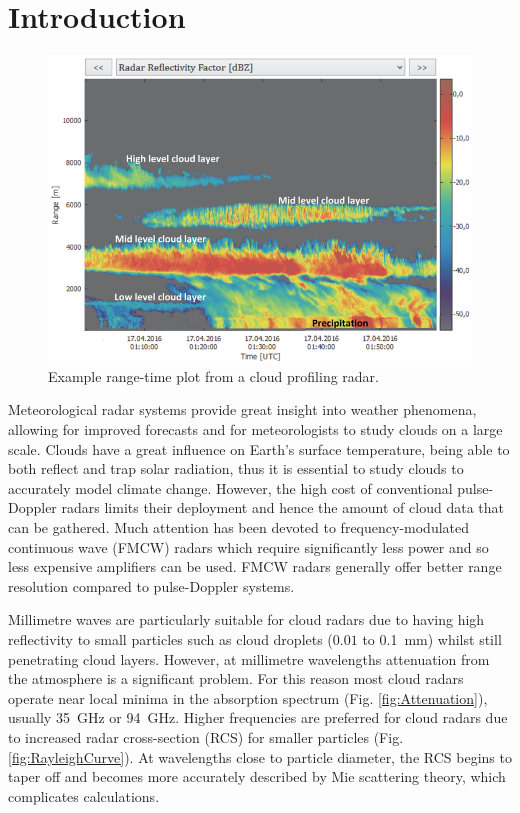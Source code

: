 \documentclass{article}
\begin{document}
\section{Introduction}
\begin{figure}
	\centering
	\includegraphics[width=\textwidth]{example-output}
	\caption{Example range-time plot from a cloud profiling radar.\supercite{RPG}}
	\label{fig:ExampleOutput}
\end{figure}
Meteorological radar systems provide great insight into weather phenomena, allowing for improved forecasts and for meteorologists to study clouds on a large scale. Clouds have a great influence on Earth’s surface temperature, being able to both reflect and trap solar radiation, thus it is essential to study clouds to accurately model climate change. However, the high cost of conventional pulse-Doppler radars limits their deployment and hence the amount of cloud data that can be gathered.\supercite{Illingworth} Much attention has been devoted to frequency-modulated continuous wave (FMCW) radars which require significantly less power and so less expensive amplifiers can be used. FMCW radars generally offer better range resolution compared to pulse-Doppler systems.

Millimetre waves are particularly suitable for cloud radars due to having high reflectivity to small particles such as cloud droplets (\(0.01\) to \SI{0.1}{\milli\metre})\supercite{FirstCourse} whilst still penetrating cloud layers. However, at millimetre wavelengths attenuation from the atmosphere is a significant problem.\supercite{KolliasFrontier} For this reason most cloud radars operate near local minima in the absorption spectrum (Fig. \ref{fig:Attenuation}), usually \SI{35}{\giga\hertz} or \SI{94}{\giga\hertz}. Higher frequencies are preferred for cloud radars due to increased radar cross-section (RCS) for smaller particles (Fig. \ref{fig:RayleighCurve}). At wavelengths close to particle diameter, the RCS begins to taper off and becomes more accurately described by Mie scattering theory,\supercite{POMRRayleighScattering} which complicates calculations.
\end{document}
